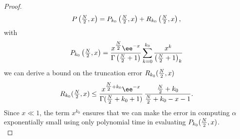 \begin{proof}
  \begin{equation}
    \label{eq:bayesian.normalization_constant.series}
    P\left( \tfrac{N}{2},x \right) = P_{k_0}\left( \tfrac{N}{2},x \right) + R_{k_0}\left( \tfrac{N}{2},x \right),
  \end{equation}
  with
  \begin{equation}
    P_{k_0}\left( \Nhalf,x \right)
    = \frac{x^{\Nhalf} \ee^{-x}}{\Gamma\left( \Nhalf + 1 \right)} \sum_{k=0}^{k_0} \frac{x^k}{{\left( \Nhalf + 1 \right)}_k}
  \end{equation}
  we can derive a bound on the truncation error $R_{k_0}(\tfrac{N}{2},x)$~\cite[Eq.~(2.18)]{Gil_2012_Efficient}
  \begin{equation}
    R_{k_0}(\Nhalf,x) \le \frac{x^{\Nhalf + k_0} \ee^{-x}}{\Gamma(\Nhalf + k_0 + 1)}\, \frac{\Nhalf + k_0}{\Nhalf + k_0 - x - 1}.
  \end{equation}
  Since $x \ll 1$, the term $x^{k_0}$ ensures that we can make the error in computing $\alpha$ exponentially small using only polynomial time in evaluating $P_{k_0}(\tfrac{N}{2}, x)$.\\



\end{proof}
